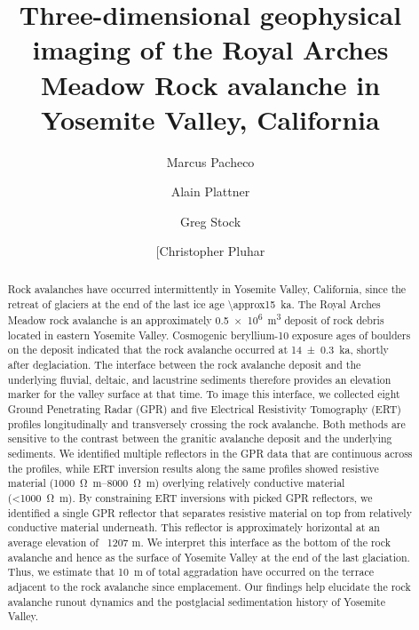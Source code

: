 \documentclass[5p]{elsarticle}
\begin{document}
	\begin{frontmatter}

\title{Three-dimensional geophysical imaging of the Royal Arches Meadow Rock avalanche in Yosemite Valley, California}

\author[Marcus]{Marcus Pacheco}
\address[Marcus]{California State University, Fresno}

\author[Alain]{Alain Plattner}
\address[Alain]{University of Alabama}

\author[Greg]{Greg Stock}
\address[Greg]{Yosemite National Park}

\author[Chris]{[Christopher Pluhar}
\address[Chris]{California State University, Fresno}



										\begin{abstract}
										

Rock avalanches have occurred intermittently in Yosemite Valley, California, since the retreat of glaciers at the end of the last ice age \SI{\approx15}{\kilo a}. The Royal Arches Meadow rock avalanche is an approximately \SI{0.5e6}{m^3} deposit of rock debris located in eastern Yosemite Valley. Cosmogenic beryllium-10 exposure ages of boulders on the deposit indicated that the rock avalanche occurred at \SI{14+-0.3}{\kilo a}, shortly after deglaciation. The interface between the rock avalanche deposit and the underlying fluvial, deltaic, and lacustrine sediments therefore provides an elevation marker for the valley surface at that time. To image this interface, we collected eight Ground Penetrating Radar (GPR) and five Electrical Resistivity Tomography (ERT) profiles longitudinally and transversely crossing the rock avalanche. Both methods are sensitive to the contrast between the granitic avalanche deposit and the underlying sediments. We identified multiple reflectors in the GPR data that are continuous across the profiles, while ERT inversion results along the same profiles showed resistive material (\SIrange{1000}{8000}{\ohm.m}) overlying relatively conductive material (\SI{<1000}{\ohm.m}). By constraining ERT inversions with picked GPR reflectors, we identified a single GPR reflector that separates resistive material on top from relatively conductive material underneath. This reflector is approximately horizontal at an average elevation of ~1207 m. We interpret this interface as the bottom of the rock avalanche and hence as the surface of Yosemite Valley at the end of the last glaciation. Thus, we estimate that \SI{10}{m} of total aggradation have occurred on the terrace adjacent to the rock avalanche since emplacement. Our findings help elucidate the rock avalanche runout dynamics and the postglacial sedimentation history of Yosemite Valley.


\end{abstract}
\end{frontmatter}
\end{document}
